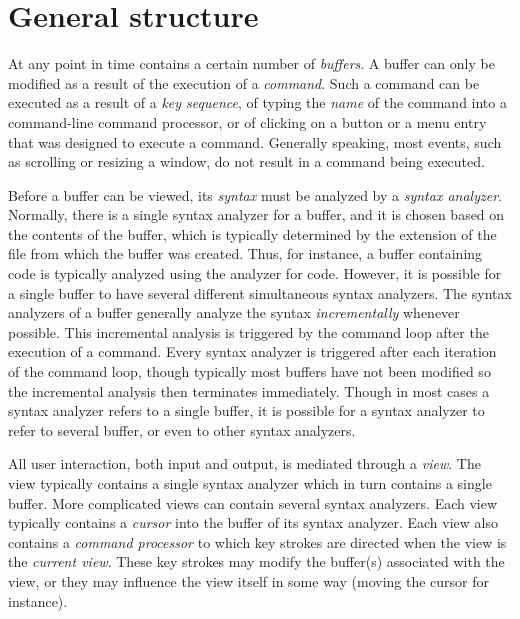 \chapter{General structure}
\label{chap-general-structure}

At any point in time \sysname{} contains a certain number of
\emph{buffers}.  A buffer can only be modified as a result of the
execution of a \emph{command}.  Such a command can be executed as a
result of a \emph{key sequence}, of typing the \emph{name} of the
command into a command-line command processor, or of clicking on a
button or a menu entry that was designed to execute a command.
Generally speaking, most events, such as scrolling or resizing a
window, do not result in a command being executed. 

Before a buffer can be viewed, its \emph{syntax} must be analyzed by a
\emph{syntax analyzer}.  Normally, there is a single syntax analyzer
for a buffer, and it is chosen based on the contents of the buffer,
which is typically determined by the extension of the file from which
the buffer was created.  Thus, for instance, a buffer containing \cl{}
code is typically analyzed using the analyzer for \cl{} code.
However, it is possible for a single buffer to have several different
simultaneous syntax analyzers.  The syntax analyzers of a buffer
generally analyze the syntax \emph{incrementally} whenever possible.
This incremental analysis is triggered by the command loop after the
execution of a command.  Every syntax analyzer is triggered after each
iteration of the command loop, though typically most buffers have not
been modified so the incremental analysis then terminates
immediately.  Though in most cases a syntax analyzer refers to a
single buffer, it is possible for a syntax analyzer to refer to
several buffer, or even to other syntax analyzers.  

All user interaction, both input and output, is mediated through a
\emph{view}.  The view typically contains a single syntax analyzer
which in turn contains a single buffer.  More complicated views can
contain several syntax analyzers.  Each view typically contains a
\emph{cursor} into the buffer of its syntax analyzer.  Each view also
contains a \emph{command processor} to which key strokes are directed
when the view is the \emph{current view}.  These key strokes may
modify the buffer(s) associated with the view, or they may influence
the view itself in some way (moving the cursor for instance).

